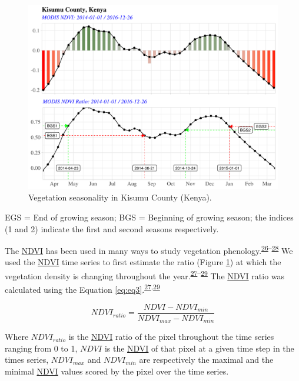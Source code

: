 \documentclass[12pt,oneside]{article}
\begin{document}
\begin{figure}
\includegraphics[width=1\linewidth]{figures/Mapping_FBFS_vegetation_seasonality} \caption{Vegetation seasonality in Kisumu County (Kenya).}\label{fig:fig2}
\end{figure}

EGS = End of growing season; BGS = Beginning of growing season; the indices (1 and 2) indicate the first and second seasons respectively.

The \href{https://www.sciencedirect.com/science/article/pii/0034425779900130?via\%3Dihub}{NDVI} has been used in many ways to study vegetation phenology.\textsuperscript{\protect\hyperlink{ref-DeLeeuw_et_al_2012}{26}--\protect\hyperlink{ref-Yu_et_al_2012}{28}} We used the \href{https://www.sciencedirect.com/science/article/pii/0034425779900130?via\%3Dihub}{NDVI} time series to first estimate the ratio (Figure \ref{fig:fig2}) at which the vegetation density is changing throughout the year.\textsuperscript{\protect\hyperlink{ref-Yu_et_al_2010}{27}--\protect\hyperlink{ref-White_et_al_1997}{29}} The \href{https://www.sciencedirect.com/science/article/pii/0034425779900130?via\%3Dihub}{NDVI} ratio was calculated using the Equation \eqref{eq:eq3}.\textsuperscript{\protect\hyperlink{ref-Yu_et_al_2010}{27},\protect\hyperlink{ref-White_et_al_1997}{29}}

\begin{equation} 
NDVI_{ratio} =   \frac{NDVI-NDVI_{min}}{NDVI_{max} - NDVI_{min}}
\label{eq:eq3}
\end{equation}

Where \(NDVI_{ratio}\) is the \href{https://www.sciencedirect.com/science/article/pii/0034425779900130?via\%3Dihub}{NDVI} ratio of the pixel throughout the time series ranging from 0 to 1, \(NDVI\) is the \href{https://www.sciencedirect.com/science/article/pii/0034425779900130?via\%3Dihub}{NDVI} of that pixel at a given time step in the times series, \(NDVI_{max}\) and \(NDVI_{min}\) are respectively the maximal and the minimal \href{https://www.sciencedirect.com/science/article/pii/0034425779900130?via\%3Dihub}{NDVI} values scored by the pixel over the time series.
\end{document}
